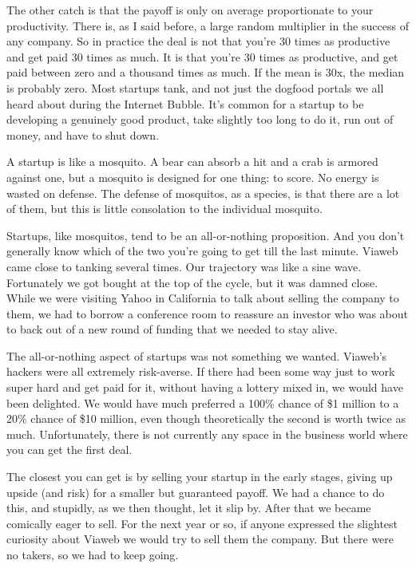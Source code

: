 \documentclass[12pt]{book}
\begin{document}
The other catch is that the payoff is only on average proportionate to
your productivity. There is, as I said before, a large random multiplier
in the success of any company. So in practice the deal is not that
you're 30 times as productive and get paid 30 times as much. It is that
you're 30 times as productive, and get paid between zero and a thousand
times as much. If the mean is 30x, the median is probably zero. Most
startups tank, and not just the dogfood portals we all heard about
during the Internet Bubble. It's common for a startup to be developing a
genuinely good product, take slightly too long to do it, run out of
money, and have to shut down.

A startup is like a mosquito. A bear can absorb a hit and a crab is
armored against one, but a mosquito is designed for one thing: to score.
No energy is wasted on defense. The defense of mosquitos, as a species,
is that there are a lot of them, but this is little consolation to the
individual mosquito.

Startups, like mosquitos, tend to be an all-or-nothing proposition. And
you don't generally know which of the two you're going to get till the
last minute. Viaweb came close to tanking several times. Our trajectory
was like a sine wave. Fortunately we got bought at the top of the cycle,
but it was damned close. While we were visiting Yahoo in California to
talk about selling the company to them, we had to borrow a conference
room to reassure an investor who was about to back out of a new round of
funding that we needed to stay alive.

The all-or-nothing aspect of startups was not something we wanted.
Viaweb's hackers were all extremely risk-averse. If there had been some
way just to work super hard and get paid for it, without having a
lottery mixed in, we would have been delighted. We would have much
preferred a 100\% chance of \$1 million to a 20\% chance of \$10
million, even though theoretically the second is worth twice as much.
Unfortunately, there is not currently any space in the business world
where you can get the first deal.

The closest you can get is by selling your startup in the early stages,
giving up upside (and risk) for a smaller but guaranteed payoff. We had
a chance to do this, and stupidly, as we then thought, let it slip by.
After that we became comically eager to sell. For the next year or so,
if anyone expressed the slightest curiosity about Viaweb we would try to
sell them the company. But there were no takers, so we had to keep
going.
\end{document}
